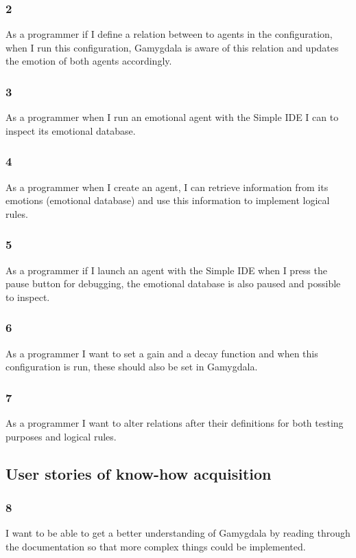 \documentclass[]{article}
\begin{document}
\subsubsection*{2}
As a programmer if I define a relation between to agents in the configuration, when I run this configuration, Gamygdala is aware of this relation and updates the emotion of both agents accordingly.

\subsubsection*{3}As a programmer when I run an emotional agent with the Simple IDE\cite{SimpleIDE} I can to inspect its emotional database.

\subsubsection*{4}As a programmer when I create an agent, I can retrieve information from its emotions (emotional database) and use this information to implement logical rules.

\subsubsection*{5} As a programmer if I launch an agent with the Simple IDE \cite{SimpleIDE} when I press the pause button for debugging, the emotional database is also paused and possible to inspect.

\subsubsection*{6} As a programmer I want to set a gain and a decay function and when this configuration is run, these should also be set in Gamygdala.

\subsubsection*{7} As a programmer I want to alter relations after their definitions for both testing purposes and logical rules.



\subsection{User stories of know-how acquisition}
\subsubsection*{8}
I want to be able to get a better understanding of Gamygdala by reading through the documentation so that more complex things could be implemented.
\end{document}
